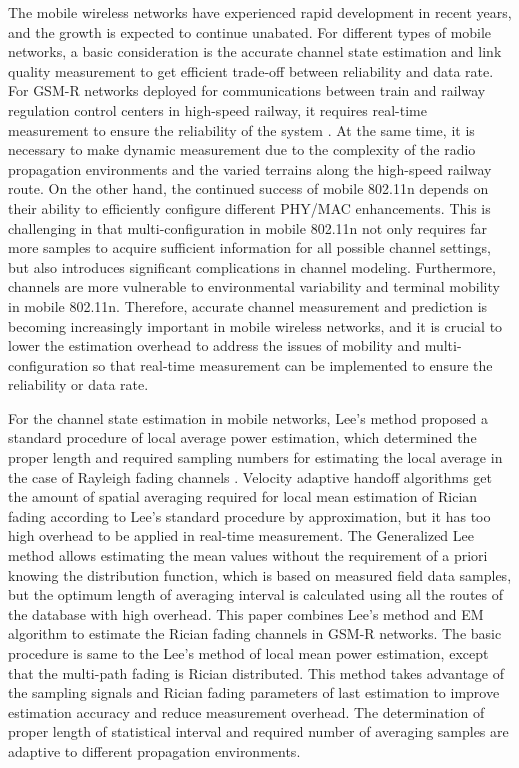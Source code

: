 \begin{englishabstract}

The mobile wireless networks have experienced rapid development in recent years, and the growth is expected to continue unabated. For different types of mobile networks, a basic consideration is the accurate channel state estimation and link quality measurement to get efficient trade-off between reliability and data rate. For GSM-R networks deployed for communications between train and railway regulation control centers in high-speed railway, it requires real-time measurement to ensure the reliability of the system \cite{baldini2010early}. At the same time, it is necessary to make dynamic measurement due to the complexity of the radio propagation environments and the varied terrains along the high-speed railway route. On the other hand, the continued success of mobile 802.11n depends on their ability to efficiently configure different PHY/MAC enhancements. This is challenging in that multi-configuration in mobile 802.11n not only requires far more samples to acquire sufficient information for all possible channel settings, but also introduces significant complications in channel modeling. Furthermore, channels are more vulnerable to environmental variability and terminal mobility in mobile 802.11n. Therefore, accurate channel measurement and prediction is becoming increasingly important in mobile wireless networks, and it is crucial to lower the estimation overhead to address the issues of mobility and multi-configuration so that real-time measurement can be implemented to ensure the reliability or data rate.

For the channel state estimation in mobile networks, Lee's method proposed a standard procedure of local average power estimation, which determined the proper length and required sampling numbers for estimating the local average in the case of Rayleigh fading channels \cite{lee1985estimate}. Velocity adaptive handoff algorithms \cite{Austin1994} get the amount of spatial averaging required for local mean estimation of Rician fading according to Lee's standard procedure by approximation, but it has too high overhead to be applied in real-time measurement. The Generalized Lee method \cite{Vega2009} allows estimating the mean values without the requirement of a priori knowing the distribution function, which is based on measured field data samples, but the optimum length of averaging interval is calculated using all the routes of the database with high overhead. This paper combines Lee's method and EM algorithm to estimate the Rician fading channels in GSM-R networks. The basic procedure is same to the Lee's method of local mean power estimation, except that the multi-path fading is Rician distributed. This method takes advantage of the sampling signals and Rician fading parameters of last estimation to improve estimation accuracy and reduce measurement overhead. The determination of proper length of statistical interval and required number of averaging samples are adaptive to different propagation environments.


\end{englishabstract}
